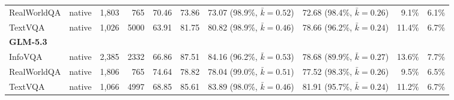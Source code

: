 \begin{table}[t]
\begin{tabular}{llrrrrllrr}
RealWorldQA & native & 1,803 & 765 & 70.46 & 73.86 & 73.07 (98.9\%, $\bar k{=}0.52$) & 72.68 (98.4\%, $\bar k{=}0.26$) & 9.1\% & 6.1\% \\
TextVQA & native & 1,026 & 5000 & 63.91 & 81.75 & 80.82 (98.9\%, $\bar k{=}0.46$) & 78.66 (96.2\%, $\bar k{=}0.24$) & 11.4\% & 6.7\% \\
\midrule
\multicolumn{10}{l}{\textbf{GLM-5.3}} \\
InfoVQA & native & 2,385 & 2332 & 66.86 & 87.51 & 84.16 (96.2\%, $\bar k{=}0.53$) & 78.68 (89.9\%, $\bar k{=}0.27$) & 13.6\% & 7.7\% \\
RealWorldQA & native & 1,806 & 765 & 74.64 & 78.82 & 78.04 (99.0\%, $\bar k{=}0.51$) & 77.52 (98.3\%, $\bar k{=}0.26$) & 9.5\% & 6.5\% \\
TextVQA & native & 1,066 & 4997 & 68.85 & 85.61 & 83.89 (98.0\%, $\bar k{=}0.46$) & 81.91 (95.7\%, $\bar k{=}0.24$) & 11.2\% & 6.7\% \\
\bottomrule
\end{tabular}
\end{table}
